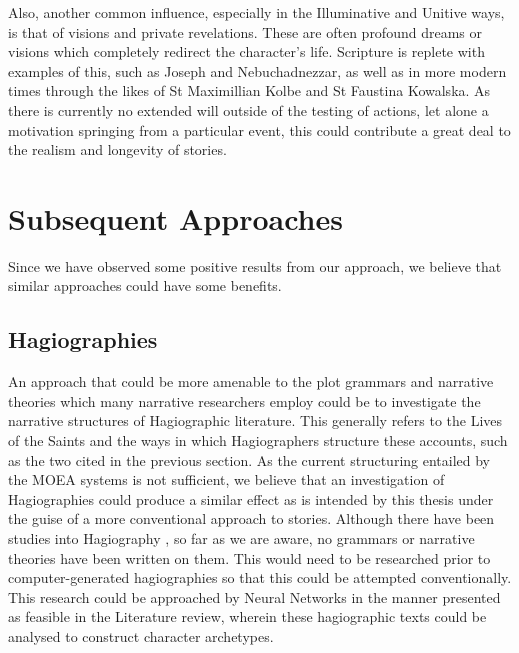 \documentclass[11pt]{article}
\begin{document}
Also, another common influence, especially in the Illuminative and Unitive ways, is that of visions and private revelations. These are often profound dreams or visions which completely redirect the character's life. Scripture is replete with examples of this, such as Joseph and Nebuchadnezzar, as well as in more modern times through the likes of St Maximillian Kolbe and St Faustina Kowalska. As there is currently no extended will outside of the testing of actions, let alone a motivation springing from a particular event, this could contribute a great deal to the realism and longevity of stories.\\

\section{Subsequent Approaches}
Since we have observed some positive results from our approach, we believe that similar approaches could have some benefits.

\subsection{Hagiographies} 
An approach that could be more amenable to the plot grammars and narrative theories which many narrative researchers employ could be to investigate the narrative structures of Hagiographic literature. This generally refers to the Lives of the Saints and the ways in which Hagiographers structure these accounts, such as the two cited in the previous section. As the current structuring entailed by the MOEA systems is not sufficient, we believe that an investigation of Hagiographies could produce a similar effect as is intended by this thesis under the guise of a more conventional approach to stories. Although there have been studies into Hagiography \cite{Haseldine1994} \cite{Krueger2004}, so far as we are aware, no grammars or narrative theories have been written on them. This would need to be researched prior to computer-generated hagiographies so that this could be attempted conventionally. This research could be approached by Neural Networks in the manner presented as feasible in the Literature review, wherein these hagiographic texts could be analysed to construct character archetypes. 
\end{document}
